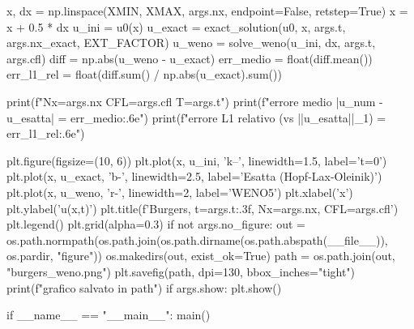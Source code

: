 \documentclass[12pt]{article}
\begin{document}
\begin{pythoncode}[title=Implementazione WENO]
    x, dx = np.linspace(XMIN, XMAX, args.nx, endpoint=False, retstep=True)
    x = x + 0.5 * dx
    u_ini = u0(x)
    u_exact = exact_solution(u0, x, args.t, args.nx_exact, EXT_FACTOR)
    u_weno = solve_weno(u_ini, dx, args.t, args.cfl)
    diff = np.abs(u_weno - u_exact)
    err_medio = float(diff.mean())
    err_l1_rel = float(diff.sum() / np.abs(u_exact).sum())

    print(f"Nx={args.nx}  CFL={args.cfl}  T={args.t}")
    print(f"errore medio |u_num - u_esatta|  = {err_medio:.6e}")
    print(f"errore L1 relativo (vs ||u_esatta||_1) = {err_l1_rel:.6e}")

    plt.figure(figsize=(10, 6))
    plt.plot(x, u_ini, 'k--', linewidth=1.5, label='t=0')
    plt.plot(x, u_exact, 'b-', linewidth=2.5, label='Esatta (Hopf-Lax-Oleinik)')
    plt.plot(x, u_weno, 'r-', linewidth=2, label='WENO5')
    plt.xlabel('x')
    plt.ylabel('u(x,t)')
    plt.title(f'Burgers, t={args.t:.3f}, Nx={args.nx}, CFL={args.cfl}')
    plt.legend()
    plt.grid(alpha=0.3)
    if not args.no_figure:
        out = os.path.normpath(os.path.join(os.path.dirname(os.path.abspath(__file__)),
                                            os.pardir, "figure"))
        os.makedirs(out, exist_ok=True)
        path = os.path.join(out, "burgers_weno.png")
        plt.savefig(path, dpi=130, bbox_inches="tight")
        print(f"grafico salvato in {path}")
    if args.show:
        plt.show()


if __name__ == "__main__":
    main()
\end{pythoncode}
\end{document}
